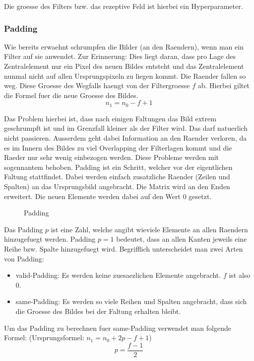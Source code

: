 Die groesse des Filters bzw. das rezeptive Feld ist hierbei ein Hyperparameter.

\subsubsection{Padding}
Wie bereits erwaehnt schrumpfen die Bilder (an den Raendern), wenn man ein Filter auf sie anwendet.
Zur Erinnerung: Dies liegt daran, dass pro Lage des Zentralelement nur ein Pixel
des neuen Bildes entsteht und das Zentralelement nunmal nicht auf allen
Ursprungspixeln zu liegen kommt. Die Raender fallen so weg. Diese Groesse des
Wegfalls haengt von der Filtergroesse $f$ ab. Hierbei giltet die Formel fuer die
neue Groesse des Bildes.
\begin{equation}
  n_1 = n_0 - f + 1
\end{equation}

Das Problem hierbei ist, dass nach einigen Faltungen das Bild extrem geschrumpft
ist und im Grenzfall kleiner als der Filter wird. Das darf natuerlich nicht
passieren. Ausserdem geht dabei Information an den Raender verloren, da es im
Innern des Bildes zu viel Overlapping der Filterlagen kommt und die Raeder nur
sehr wenig einbezogen werden.
\para{}
Diese Probleme werden mit sogennantem  behoben. Padding ist ein
Schritt, welcher vor der eigentlichen Faltung stattfindet. Dabei werden einfach
zusatzliche Raender (Zeilen und Spalten) an das Ursprungsbild angebracht. Die
Matrix wird an den Enden erweitert. Die neuen Elemente werden dabei auf den Wert
$0$ gesetzt.

\begin{figure}[h!]

  \caption{Padding}
\end{figure}

Das Padding $p$ ist eine Zahl, welche angibt wieviele Elemente an allen Raendern
hinzugefuegt werden. Padding $p = 1$ bedeutet, dass an allen Kanten jeweils eine
Reihe bzw. Spalte hinzugefuegt wird.
Begrifflich unterscheidet man zwei Arten von Padding:
\begin{itemize}
\item{valid-Padding: Es werden keine zuesaezlichen Elemente angebracht. $f$ ist also 0.}
\item{same-Padding: Es werden so viele Reihen und Spalten angebracht, dass
    sich die Groesse des Bildes bei der Faltung erhalten bleibt.}
\end{itemize}

Um das Padding zu berechnen fuer same-Padding verwendet man folgende Formel:
(Ursprungsformel: $n_1 = n_0 + 2p - f + 1$)
\begin{equation}
  p = \frac{f-1}{2}
\end{equation}

